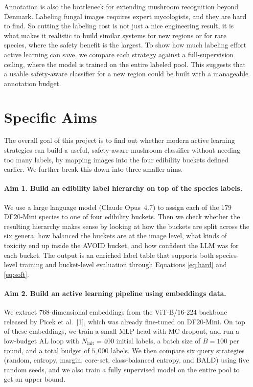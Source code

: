 \documentclass[11pt]{article}
\begin{document}
Annotation is also the bottleneck for extending mushroom recognition beyond
Denmark. Labeling fungal images requires expert mycologists, and they are
hard to find. So cutting the labeling cost is not just a nice engineering
result, it is what makes it realistic to build similar systems for new
regions or for rare species, where the safety benefit is the largest. To show how much labeling effort active learning can save, we compare each
strategy against a full-supervision ceiling, where the model is trained on
the entire labeled pool. This suggests that a usable safety-aware
classifier for a new region could be built with a manageable annotation
budget.

\section{Specific Aims}

The overall goal of this project is to find out whether modern active
learning strategies can build a useful, safety-aware mushroom classifier
without needing too many labels, by mapping images into the four edibility
buckets defined earlier. We further break this down into three smaller aims.

\paragraph{Aim 1. Build an edibility label hierarchy on top of the species
labels.}
We use a large language model (Claude Opus~4.7) to assign each of the $179$
DF20-Mini species to one of four edibility buckets. Then we check whether
the resulting hierarchy makes sense by looking at how the buckets are split
across the six genera, how balanced the buckets are at the image level, what
kinds of toxicity end up inside the AVOID bucket, and how confident the LLM
was for each bucket. The output is an enriched label table that supports both
species-level training and bucket-level evaluation through Equations
\eqref{eq:hard} and \eqref{eq:soft}.

\paragraph{Aim 2. Build an active learning pipeline using 
embeddings data.}
We extract $768$-dimensional embeddings from the ViT-B/16-224 backbone
released by Picek et al.~[1], which was already fine-tuned on DF20-Mini. On
top of these embeddings, we train a small MLP head with MC-dropout,
and run a low-budget AL loop with $N_{\text{init}}=400$ initial labels, a
batch size of $B=100$ per round, and a total budget of $5{,}000$ labels.
We then compare six query strategies (random, entropy, margin, core-set,
class-balanced entropy, and BALD) using five random seeds, and we also train
a fully supervised model on the entire pool to get an upper bound.
\end{document}
